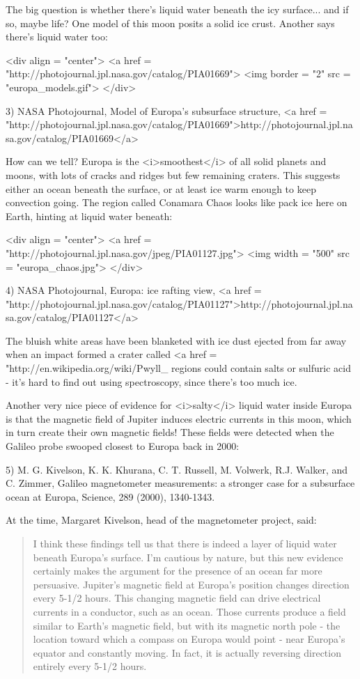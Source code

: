 The big question is whether there's liquid water beneath the icy
surface... and if so, maybe life?  One model of this moon posits a 
solid ice crust.  Another says there's liquid water too:

<div align = "center">
<a href = "http://photojournal.jpl.nasa.gov/catalog/PIA01669">
<img border = "2" src = "europa_models.gif">
</div>

3) NASA Photojournal, Model of Europa's subsurface structure,
<a href = "http://photojournal.jpl.nasa.gov/catalog/PIA01669">http://photojournal.jpl.nasa.gov/catalog/PIA01669</a>

How can we tell?  Europa is the <i>smoothest</i> of all solid planets
and moons, with lots of cracks and ridges but few remaining craters.
This suggests either an ocean beneath the surface, or at least ice
warm enough to keep convection going.  The region called Conamara
Chaos looks like pack ice here on Earth, hinting at liquid water
beneath:

<div align = "center">
<a href = "http://photojournal.jpl.nasa.gov/jpeg/PIA01127.jpg">
<img width = "500" src = "europa_chaos.jpg">
</div>

4) NASA Photojournal, Europa: ice rafting view,
<a href = "http://photojournal.jpl.nasa.gov/catalog/PIA01127">http://photojournal.jpl.nasa.gov/catalog/PIA01127</a>

The bluish white areas have been blanketed with ice dust ejected from
far away when an impact formed a crater called <a href = "http://en.wikipedia.org/wiki/Pwyll_%
regions could contain salts or sulfuric acid - it's hard to find out
using spectroscopy, since there's too much ice.

Another very nice piece of evidence for <i>salty</i> liquid water inside 
Europa is that the magnetic field of Jupiter induces electric currents 
in  this moon, which in turn create their own magnetic fields!  These 
fields were detected when the Galileo probe swooped closest to Europa
back in 2000:

5) M. G. Kivelson, K. K. Khurana, C. T. Russell, M. Volwerk, R.J. Walker, 
and C. Zimmer, Galileo magnetometer measurements: a stronger case for a 
subsurface ocean at Europa, Science, 289 (2000), 1340-1343.

At the time, Margaret Kivelson, head of the magnetometer project, said: 

\begin{quote}
  I think these findings tell us that there is indeed a layer of liquid 
  water beneath Europa's surface.  I'm cautious by nature, but this new 
  evidence certainly makes the argument for the presence of an ocean far 
  more persuasive.  Jupiter's magnetic field at Europa's position changes 
  direction every 5-1/2 hours.  This changing magnetic field can drive 
  electrical currents in a conductor, such as an ocean. Those currents 
  produce a field similar to Earth's magnetic field, but with its magnetic 
  north pole - the location toward which a compass on Europa would point - 
  near Europa's equator and constantly moving. In fact, it is actually 
  reversing direction entirely every 5-1/2 hours.
\end{quote}
    


